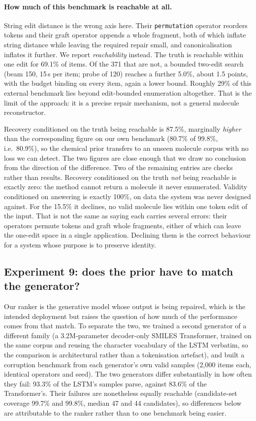 \documentclass[journal=jcisd8,manuscript=article]{achemso}
\begin{document}
\paragraph{How much of this benchmark is reachable at all.}
String edit distance is the wrong axis here. Their \texttt{permutation} operator
reorders tokens and their graft operator appends a whole fragment, both of which
inflate string distance while leaving the required repair small, and
canonicalisation inflates it further. We report \emph{reachability} instead. The truth is reachable within one edit for 69.1\% of items. Of the 371
that are not, a bounded two-edit search (beam 150, 15\,s per item; probe of 120)
reaches a further 5.0\%, about 1.5 points, with the budget binding on every
item, again a lower bound. Roughly 29\% of this external benchmark lies beyond
edit-bounded enumeration altogether. That is the limit of the approach: it is a
precise repair mechanism, not a general molecule reconstructor.

\noindent
Recovery conditioned on the truth being reachable is 87.5\%, marginally
\emph{higher} than the corresponding figure on our own benchmark (80.7\% of
99.8\%, i.e.\ 80.9\%), so the chemical prior transfers to an unseen molecule
corpus with no loss we can detect. The two figures are close enough that we
draw no conclusion from the direction of the difference. Two of the remaining entries are checks rather than
results. Recovery conditioned on the truth \emph{not} being reachable is exactly
zero: the method cannot return a molecule it never enumerated. Validity
conditioned on answering is exactly 100\%, on data the system was never designed
against. For the 15.5\% it declines, no valid molecule lies within one token
edit of the input. That is not the same as saying each carries several errors:
their operators permute tokens and graft whole fragments, either of which can
leave the one-edit space in a single application. Declining them is the correct
behaviour for a system whose purpose is to preserve identity.

\subsection{Experiment 9: does the prior have to match the generator?}\label{sec:exp9}

Our ranker is the generative model whose output is being repaired, which is the
intended deployment but raises the question of how much of the performance comes
from that match. To separate the two, we trained a second generator of a
different family (a 3.2M-parameter decoder-only SMILES Transformer, trained on
the same corpus and reusing the character vocabulary of the LSTM verbatim, so
the comparison is architectural rather than a tokenisation artefact), and built a
corruption benchmark from each generator's own valid samples (2{,}000 items
each, identical operators and seed). The two generators differ substantially in
how often they fail: 93.3\% of the LSTM's samples parse, against 83.6\% of the
Transformer's. Their failures are nonetheless equally reachable (candidate-set
coverage 99.7\% and 99.8\%, median 47 and 44 candidates), so differences below
are attributable to the ranker rather than to one benchmark being easier.
\end{document}

